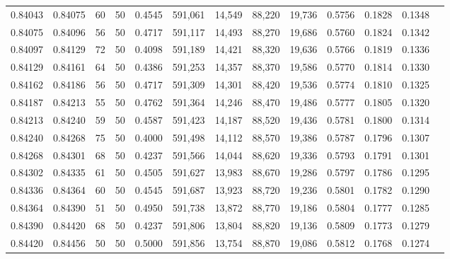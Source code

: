 \begin{tabular}{rrrrrrrrrrrrr}
0.84043 & 0.84075 &    60 &  50 &                                     0.4545 & 591,061 &  14,549 &  88,220 &  19,736 & 0.5756 & 0.1828 & 0.1348 \\
0.84075 & 0.84096 &    56 &  50 &                                     0.4717 & 591,117 &  14,493 &  88,270 &  19,686 & 0.5760 & 0.1824 & 0.1342 \\
0.84097 & 0.84129 &    72 &  50 &                                     0.4098 & 591,189 &  14,421 &  88,320 &  19,636 & 0.5766 & 0.1819 & 0.1336 \\
0.84129 & 0.84161 &    64 &  50 &                                     0.4386 & 591,253 &  14,357 &  88,370 &  19,586 & 0.5770 & 0.1814 & 0.1330 \\
0.84162 & 0.84186 &    56 &  50 &                                     0.4717 & 591,309 &  14,301 &  88,420 &  19,536 & 0.5774 & 0.1810 & 0.1325 \\
0.84187 & 0.84213 &    55 &  50 &                                     0.4762 & 591,364 &  14,246 &  88,470 &  19,486 & 0.5777 & 0.1805 & 0.1320 \\
0.84213 & 0.84240 &    59 &  50 &                                     0.4587 & 591,423 &  14,187 &  88,520 &  19,436 & 0.5781 & 0.1800 & 0.1314 \\
0.84240 & 0.84268 &    75 &  50 &                                     0.4000 & 591,498 &  14,112 &  88,570 &  19,386 & 0.5787 & 0.1796 & 0.1307 \\
0.84268 & 0.84301 &    68 &  50 &                                     0.4237 & 591,566 &  14,044 &  88,620 &  19,336 & 0.5793 & 0.1791 & 0.1301 \\
0.84302 & 0.84335 &    61 &  50 &                                     0.4505 & 591,627 &  13,983 &  88,670 &  19,286 & 0.5797 & 0.1786 & 0.1295 \\
0.84336 & 0.84364 &    60 &  50 &                                     0.4545 & 591,687 &  13,923 &  88,720 &  19,236 & 0.5801 & 0.1782 & 0.1290 \\
0.84364 & 0.84390 &    51 &  50 &                                     0.4950 & 591,738 &  13,872 &  88,770 &  19,186 & 0.5804 & 0.1777 & 0.1285 \\
0.84390 & 0.84420 &    68 &  50 &                                     0.4237 & 591,806 &  13,804 &  88,820 &  19,136 & 0.5809 & 0.1773 & 0.1279 \\
0.84420 & 0.84456 &    50 &  50 &                                     0.5000 & 591,856 &  13,754 &  88,870 &  19,086 & 0.5812 & 0.1768 & 0.1274 \\

\end{tabular}
